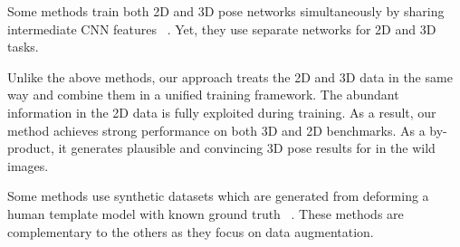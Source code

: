\documentclass[10pt,twocolumn,letterpaper]{article}
\newcommand{\ForXiao}[1]{\textcolor{red}{(For Xiao: #1)}}
\begin{document}
Some methods train both 2D and 3D pose networks simultaneously by sharing intermediate CNN features ~\cite{mehta2016monocular, park20163d}. Yet, they use separate networks for 2D and 3D tasks.



Unlike the above methods, our approach treats the 2D and 3D data in the same way and combine them in a unified training framework. The abundant information in the 2D data is fully exploited during training. As a result, our method achieves strong performance on both 3D and 2D benchmarks. As a by-product, it generates plausible and convincing 3D pose results for in the wild images.

Some methods use synthetic datasets which are generated from deforming a human template model with known ground truth ~\cite{chen2016synthesizing, rogez2016mocap}. These methods are complementary to the others as they focus on data augmentation.


%



\end{document}
